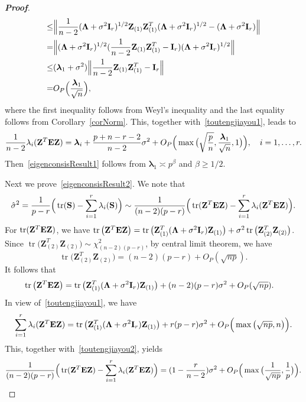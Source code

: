 \documentclass[review]{elsarticle}
\DeclareMathOperator{\mytr}{tr}
\newcommand{\bZ}{\mathbf{Z}}
\newcommand{\bfsym}[1]{\ensuremath{\boldsymbol{#1}}}
\def\blambda {\bfsym {\lambda}}        \def\bLambda {\bfsym {\Lambda}}
\theoremstyle{plain}
\theoremstyle{definition}
\theoremstyle{remark}
\begin{document}
\begin{appendices}
\begin{proof}[\textbf{Proof}]
$$\begin{aligned}
        \leq &
        \Big\|
        \frac{1}{n-2}(\bLambda+\sigma^2 \BI_r)^{1/2}\bZ_{(1)}\bZ_{(1)}^T(\bLambda+\sigma^2 \BI_r)^{1/2}
        -(\bLambda+\sigma^2 \BI_r)
        \Big\|\\
        = &
        \Big\|
        (\bLambda+\sigma^2 \BI_r)^{1/2}(\frac{1}{n-2}\bZ_{(1)}\bZ_{(1)}^T-\BI_r)(\bLambda+\sigma^2 \BI_r)^{1/2}
        \Big\|\\
        \leq &
        (\blambda_1 + \sigma^2)
        \Big\|\frac{1}{n-2}\bZ_{(1)}\bZ_{(1)}^T-\BI_r\Big\|\\
        = &
        O_P\Big(\frac{\blambda_1}{\sqrt{n}}\Big),
    \end{aligned}
    $$
    where the first inequality follows from Weyl's inequality and the last equality follows from Corollary~\ref{corNorm}.
    This, together with~\eqref{toutengjiayou1}, leads to
$$
\frac{1}{n-2}\lambda_i(\BZ^T \BE \BZ)=
\blambda_i+\frac{p+n-r-2}{n-2}\sigma^2+O_P\Big(\max\big(\sqrt{\frac{p}{n}},\frac{\blambda_1}{\sqrt{n}},1\big)\Big),\quad i=1,\ldots, r.
$$
Then~\eqref{eigenconsisResult1} follows from $\blambda_1\asymp p^{\beta}$ and $\beta\geq 1/2$.
    
    Next we prove~\eqref{eigenconsisResult2}.
    We note that
    $$
    \hat{\sigma}^2=\frac{1}{p-r}\Big(\mytr(\BS)-\sum_{i=1}^r \lambda_i(\BS)\Big)
    \sim
\frac{1}{(n-2)(p-r)}\Big(\mytr(\BZ^T \BE \BZ)-\sum_{i=1}^r \lambda_i(\BZ^T \BE \BZ)\Big).
    $$
    For $\mytr(\BZ^T \BE \BZ)$, we have
    $
            \mytr\big(\bZ^T \BE \bZ\big)= \mytr\big(\bZ_{(1)}^T (\bLambda +\sigma^2 \BI_r) \bZ_{(1)}\big)+
       \sigma^2 \mytr\big( \bZ_{(2)}^T  \bZ_{(2)}\big)
    $.
    Since $\mytr\big( \bZ_{(2)}^T  \bZ_{(2)}\big)\sim \chi^2_{(n-2)(p-r)}$, by central limit theorem, we have
    $$\mytr\big( \bZ_{(2)}^T  \bZ_{(2)}\big)=(n-2)(p-r)+O_P(\sqrt{np}).$$
    It follows that
    \begin{equation}\label{toutengjiayou2}
        \begin{aligned}
            \mytr\big(\bZ^T \BE \bZ\big)&= \mytr\big(\bZ_{(1)}^T (\bLambda +\sigma^2 \BI_r) \bZ_{(1)}\big)+
            (n-2)(p-r)\sigma^2+O_P(\sqrt{np}).
        \end{aligned}
    \end{equation}
    In view of~\eqref{toutengjiayou1}, we have
    $$
\sum_{i=1}^r\lambda_i(\BZ^T \BE \BZ)
=\mytr\big(\BZ_{(1)}^T (\bLambda+\sigma^2 \BI_r)\BZ_{(1)}\big)
+r(p-r)\sigma^2
+
O_P\Big(\max\big(\sqrt{np},n\big)\Big).
    $$
    This, together with~\eqref{toutengjiayou2}, yields
    $$
\frac{1}{(n-2)(p-r)}\Big(\mytr(\BZ^T \BE \BZ)-\sum_{i=1}^r \lambda_i(\BZ^T \BE \BZ)\Big)=
(1-\frac{r}{n-2})\sigma^2+
O_P\Big(\max\big(\frac{1}{\sqrt{np}},\frac{1}{p}\big)\Big).
    $$
\end{proof}


\end{appendices}
\end{document}
